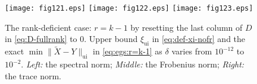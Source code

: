 \documentclass[11pt]{article}
\DeclareMathOperator{\UI}{ui}
\def\wtd{\widetilde}
\theoremstyle{definition}
\numberwithin{equation}{section}
\numberwithin{figure}{section}
\numberwithin{table}{section}
\begin{document}
\begin{figure}
\begin{center}
\texttt{[image: fig121.eps]}
\texttt{[image: fig122.eps]}
\texttt{[image: fig123.eps]}
\end{center}
\vspace{-10pt}
\caption{\small
         The rank-deficient case: $r=k-1$ by resetting the last column of $D$ in \eqref{eq:D-fullrank} to $0$.
         Upper bound $\xi_{\UI}$ in \eqref{eq:def-xi-nofr} and the exact $\min\|\wtd X-Y\|_{\UI}$ in
         \eqref{eq:egs:r=k-1}
         as $\delta$ varies from $10^{-12}$ to $10^{-2}$.
         {\em Left:\/} the spectral norm; {\em Middle:\/} the Frobenius norm;
         {\em Right:\/} the trace norm.}
\label{fig2}
\end{figure}
\end{document}
